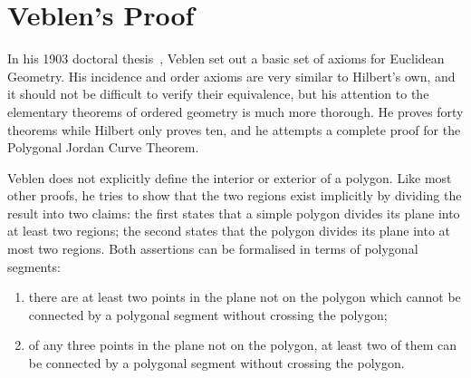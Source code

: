 


\section{Veblen's Proof}\label{sec:VeblenProof}
In his 1903 doctoral thesis~\cite{Veblenphd}, Veblen set out a basic set of axioms for Euclidean Geometry. His incidence and order axioms are very similar to Hilbert's own, and it should not be difficult to verify their equivalence, but his attention to the elementary theorems of ordered geometry is much more thorough. He proves forty theorems while Hilbert only proves ten, and he attempts a complete proof for the Polygonal Jordan Curve Theorem.

Veblen does not explicitly define the interior or exterior of a polygon. Like most other proofs, he tries to show that the two regions exist implicitly by dividing the result into two claims: the first states that a simple polygon divides its plane into at least two regions; the second states that the polygon divides its plane into at most two regions. Both assertions can be formalised in terms of polygonal segments:
\begin{enumerate}
\item there are at least two points in the plane not on the polygon which cannot be connected by a polygonal segment without crossing the polygon\label{list:VeblenLemma1};
\item of any three points in the plane not on the polygon, at least two of them can be connected by a polygonal segment without crossing the polygon.
\end{enumerate}

